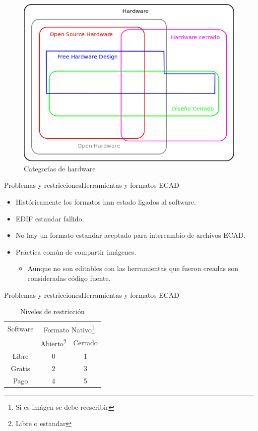 \documentclass{beamer}
\begin{document}
\begin{frame}
  \begin{figure}
    \includegraphics[scale=0.3]{img/categorias}
    \caption{Categorías de hardware}
    \label{fig:categorias}
  \end{figure}
\end{frame}

\begin{frame}{Problemas y restricciones}{Herramientas y formatos ECAD}
  \begin{itemize}
  \item Históricamente los formatos han estado ligados al software.
  \item EDIF estandar fallido.
  \item No hay un formato estandar aceptado para intercambio de archivos ECAD.
  \item Práctica común de compartir imágenes.
    \begin{itemize}
    \item Aunque no son editables con las herramientas que fueron creadas son consideradas código fuente.
    \end{itemize}
  \end{itemize}
\end{frame}

\begin{frame}{Problemas y restricciones}{Herramientas y formatos ECAD}
  \begin{table}
    \begin{tabular}{|c|c|c|}
      \hline
      Software & \multicolumn{2}{c|}{Formato Nativo\footnote{Si es imágen se debe reescribir}}\\
       & Abierto\footnote{Libre o estandar} & Cerrado\\
      \hline
      Libre & 0 & 1\\
      Gratis & 2 & 3\\
      Pago & 4 & 5\\
      \hline
    \end{tabular}
    \caption{Niveles de restricción}
    \label{tab:niveles}
  \end{table}
\end{frame}
\end{document}
